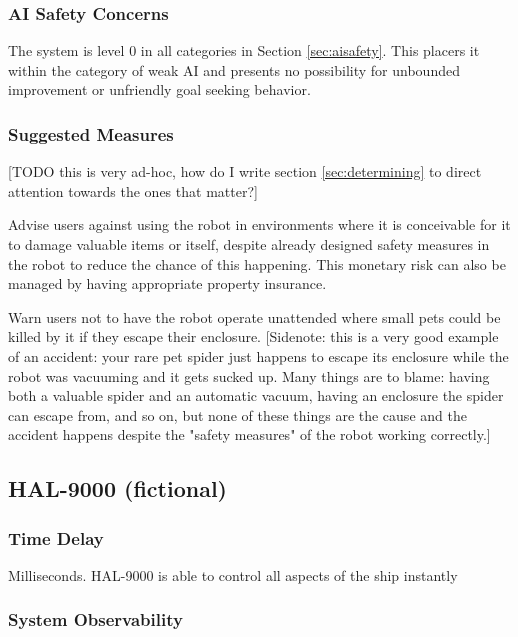 \documentclass[11pt]{article}
\begin{document}
\subsubsection{AI Safety Concerns}

The system is level 0 in all categories in Section \ref{sec:aisafety}. This placers it within the
category of weak AI and presents no possibility for unbounded improvement or unfriendly goal seeking
behavior.

\subsubsection{Suggested Measures}

[TODO this is very ad-hoc, how do I write section \ref{sec:determining} to direct attention towards
the ones that matter?]

Advise users against using the robot in environments where it is conceivable for it to damage
valuable items or itself, despite already designed safety measures in the robot to reduce the chance
of this happening. This monetary risk can also be managed by having appropriate property insurance.

Warn users not to have the robot operate unattended where small pets could be killed by it if they
escape their enclosure. [Sidenote: this is a very good example of an accident: your rare pet spider
just happens to escape its enclosure while the robot was vacuuming and it gets sucked up. Many
things are to blame: having both a valuable spider and an automatic vacuum, having an enclosure the
spider can escape from, and so on, but none of these things are the cause and the accident happens
despite the "safety measures" of the robot working correctly.]


\subsection{HAL-9000 (fictional)}



\subsubsection*{Time Delay}

Milliseconds. HAL-9000 is able to control all aspects of the ship instantly


\subsubsection*{System Observability}
\end{document}
